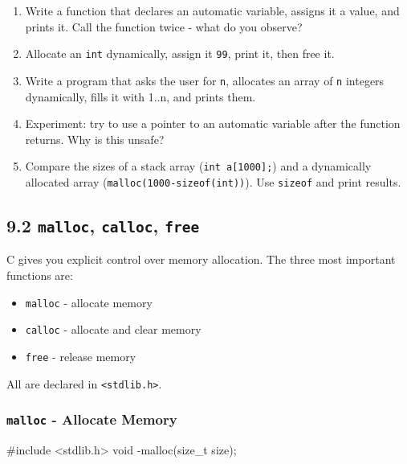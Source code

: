 \documentclass[
  letterpaper,
  DIV=11,
  numbers=noendperiod]{scrreprt}
\newenvironment{Shaded}{\begin{snugshade}}{\end{snugshade}}
\newcommand{\DataTypeTok}[1]{\textcolor[rgb]{0.68,0.00,0.00}{#1}}
\newcommand{\ImportTok}[1]{\textcolor[rgb]{0.00,0.46,0.62}{#1}}
\newcommand{\NormalTok}[1]{\textcolor[rgb]{0.00,0.23,0.31}{#1}}
\newcommand{\OperatorTok}[1]{\textcolor[rgb]{0.37,0.37,0.37}{#1}}
\newcommand{\PreprocessorTok}[1]{\textcolor[rgb]{0.68,0.00,0.00}{#1}}
\providecommand{\tightlist}{%
  \setlength{\itemsep}{0pt}\setlength{\parskip}{0pt}}
\begin{document}
\begin{enumerate}
\def\labelenumi{\arabic{enumi}.}
\tightlist
\item
  Write a function that declares an automatic variable, assigns it a
  value, and prints it. Call the function twice - what do you observe?
\item
  Allocate an \texttt{int} dynamically, assign it \texttt{99}, print it,
  then free it.
\item
  Write a program that asks the user for \texttt{n}, allocates an array
  of \texttt{n} integers dynamically, fills it with 1..n, and prints
  them.
\item
  Experiment: try to use a pointer to an automatic variable after the
  function returns. Why is this unsafe?
\item
  Compare the sizes of a stack array (\texttt{int\ a{[}1000{]};}) and a
  dynamically allocated array (\texttt{malloc(1000-sizeof(int))}). Use
  \texttt{sizeof} and print results.
\end{enumerate}

\subsection{\texorpdfstring{9.2 \texttt{malloc}, \texttt{calloc},
\texttt{free}}{9.2 malloc, calloc, free}}\label{malloc-calloc-free}

C gives you explicit control over memory allocation. The three most
important functions are:

\begin{itemize}
\tightlist
\item
  \texttt{malloc} - allocate memory
\item
  \texttt{calloc} - allocate and clear memory
\item
  \texttt{free} - release memory
\end{itemize}

All are declared in \texttt{\textless{}stdlib.h\textgreater{}}.

\subsubsection{\texorpdfstring{\texttt{malloc} - Allocate
Memory}{malloc - Allocate Memory}}\label{malloc---allocate-memory}

\begin{Shaded}
\begin{Highlighting}[]
\PreprocessorTok{\#include }\ImportTok{\textless{}stdlib.h\textgreater{}}
\DataTypeTok{void} \OperatorTok{{-}}\NormalTok{malloc}\OperatorTok{(}\DataTypeTok{size\_t}\NormalTok{ size}\OperatorTok{);}
\end{Highlighting}
\end{Shaded}
\end{document}
